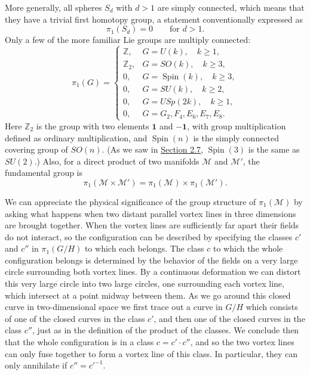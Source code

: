 More generally, all spheres $S_d$ with $d>1$ are simply connected, which
means that they have a trivial first homotopy group, a statement
conventionally expressed as
\begin{equation}
 \pi_1(S_d)=0\qquad\text{for }d>1.
 \tag{23.2.3}\label{eq:23.2.3}
\end{equation}
Only a few of the more familiar Lie groups are multiply connected:
\begin{equation}
 \pi_1(G)=
 \begin{cases}
  \mathbb Z,&G=U(k),\quad k\geq1,\\
  \mathbb Z_2,&G=SO(k),\quad k\geq3,\\
  0,&G=\operatorname{Spin}(k),\quad k\geq3,\\
  0,&G=SU(k),\quad k\geq2,\\
  0,&G=USp(2k),\quad k\geq1,\\
  0,&G=G_2,F_4,E_6,E_7,E_8.
 \end{cases}
 \tag{23.2.4}\label{eq:23.2.4}
\end{equation}
Here $\mathbb Z_2$ is the group with two elements $\mathbf{1}$ and
$-\mathbf{1}$, with group multiplication defined as ordinary
multiplication, and $\operatorname{Spin}(n)$ is the simply connected
covering group of $SO(n)$. (As we saw in
\hyperref[sec:2.7]{Section 2.7}, $\operatorname{Spin}(3)$ is the same as
$SU(2)$.) Also, for a direct product of two manifolds $\mathcal M$ and
$\mathcal M'$, the fundamental group is
\begin{equation}
 \pi_1(\mathcal M\times\mathcal M')
 =\pi_1(\mathcal M)\times\pi_1(\mathcal M').
 \tag{23.2.5}\label{eq:23.2.5}
\end{equation}

We can appreciate the physical significance of the group structure of
$\pi_1(\mathcal M)$ by asking what happens when two distant parallel
vortex lines in three dimensions are brought together. When the vortex
lines are sufficiently far apart their fields do not interact, so the
configuration can be described by specifying the classes $c'$ and $c''$
in $\pi_1(G/H)$ to which each belongs. The class $c$ to which the whole
configuration belongs is determined by the behavior of the fields on a
very large circle surrounding both vortex lines. By a continuous
deformation we can distort this very large circle into two large circles,
one surrounding each vortex line, which intersect at a point midway
between them. As we go around this closed curve in two-dimensional space
we first trace out a curve in $G/H$ which consists of one of the closed
curves in the class $c'$, and then one of the closed curves in the class
$c''$, just as in the definition of the product of the classes. We
conclude then that the whole configuration is in a class
$c=c'\cdot c''$, and so the two vortex lines can only fuse together to
form a vortex line of this class. In particular, they can only annihilate
if $c''=c'^{-1}$.

